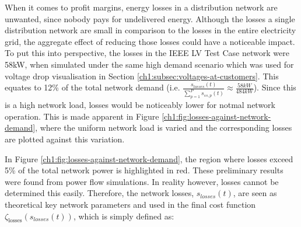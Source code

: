 When it comes to profit margins, energy losses in a distribution network are unwanted, since nobody pays for undelivered energy.
Although the losses a single distribution network are small in comparison to the losses in the entire electricity grid, the aggregate effect of reducing those losses could have a noticeable impact.
To put this into perspective, the losses in the IEEE LV Test Case network were 58kW, when simulated under the same high demand scenario which was used for voltage drop visualisation in Section \ref{ch1:subsec:voltages-at-customers}.
This equates to 12\% of the total network demand ($\text{i.e. }\frac{s_{losses}(t)}{\sum_{p=1}^P{s_{ss,p}(t)}} \approx \frac{58kW}{484kW}$).
Since this is a high network load, losses would be noticeably lower for notmal network operation.
This is made apparent in Figure \ref{ch1:fig:losses-against-network-demand}, where the uniform network load is varied and the corresponding losses are plotted against this variation.



In Figure \ref{ch1:fig:losses-against-network-demand}, the region where losses exceed 5\% of the total network power is highlighted in red.
These preliminary results were found from power flow simulations.
In reality however, losses cannot be determined this easily.
Therefore, the network losses, $s_{losses}(t)$, are seen as theoretical key network parameters and used in the final cost function $\zeta_\text{losses}(s_{losses}(t))$, which is simply defined as:



